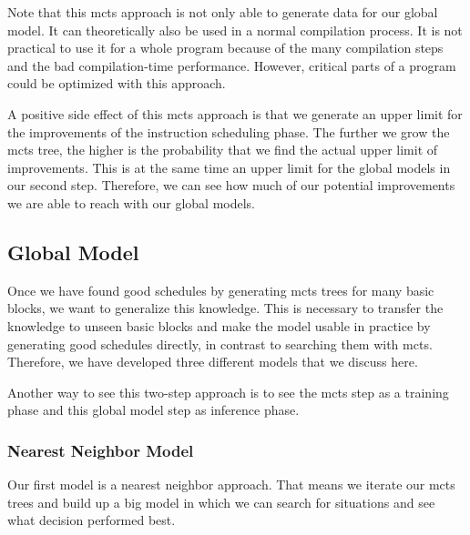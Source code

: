Note that this \ac{mcts} approach is not only able to generate data for our global model.
It can theoretically also be used in a normal compilation process.
It is not practical to use it for a whole program because of the many compilation steps and the bad compilation-time performance.
However, critical parts of a program could be optimized with this approach.

A positive side effect of this \ac{mcts} approach is that we generate an upper limit for the improvements of the instruction scheduling phase.
The further we grow the \ac{mcts} tree, the higher is the probability that we find the actual upper limit of improvements.
This is at the same time an upper limit for the global models in our second step.
Therefore, we can see how much of our potential improvements we are able to reach with our global models.

\subsection{Global Model}
\label{subsec:approach:ml:global}
Once we have found good schedules by generating \ac{mcts} trees for many basic blocks, we want to generalize this knowledge.
This is necessary to transfer the knowledge to unseen basic blocks and make the model usable in practice by generating good schedules directly, in contrast to searching them with \ac{mcts}.
Therefore, we have developed three different models that we discuss here.

Another way to see this two-step approach is to see the \ac{mcts} step as a training phase and this global model step as inference phase.

\subsubsection{Nearest Neighbor Model}
\label{sec:app:nearest-neighbor}
Our first model is a nearest neighbor approach.
That means we iterate our \ac{mcts} trees and build up a big model in which we can search for situations and see what decision performed best.

